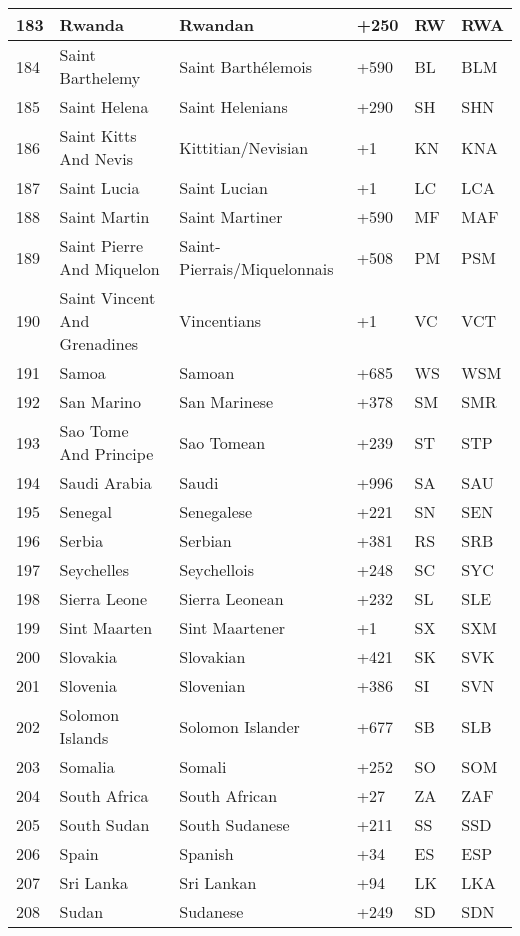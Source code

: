\begin{longtable}{|l|l|l|l|l|l|}
183 & Rwanda & Rwandan & +250 & RW & RWA \\ \hline 
184 & Saint Barthelemy & Saint Barthélemois & +590 & BL & BLM \\ \hline 
185 & Saint Helena & Saint Helenians & +290 & SH & SHN \\ \hline 
186 & Saint Kitts And Nevis & Kittitian/Nevisian & +1 & KN & KNA \\ \hline 
187 & Saint Lucia & Saint Lucian & +1 & LC & LCA \\ \hline 
188 & Saint Martin & Saint Martiner & +590 & MF & MAF \\ \hline 
189 & Saint Pierre And Miquelon & Saint-Pierrais/Miquelonnais & +508 & PM & PSM \\ \hline 
190 & Saint Vincent And Grenadines & Vincentians & +1 & VC & VCT \\ \hline 
191 & Samoa & Samoan & +685 & WS & WSM \\ \hline 
192 & San Marino & San Marinese & +378 & SM & SMR \\ \hline 
193 & Sao Tome And Principe & Sao Tomean & +239 & ST & STP \\ \hline 
194 & Saudi Arabia & Saudi & +996 & SA & SAU \\ \hline 
195 & Senegal & Senegalese & +221 & SN & SEN \\ \hline 
196 & Serbia & Serbian & +381 & RS & SRB \\ \hline 
197 & Seychelles & Seychellois & +248 & SC & SYC \\ \hline 
198 & Sierra Leone & Sierra Leonean & +232 & SL & SLE \\ \hline 
199 & Sint Maarten & Sint Maartener & +1 & SX & SXM \\ \hline 
200 & Slovakia & Slovakian & +421 & SK & SVK \\ \hline 
201 & Slovenia & Slovenian & +386 & SI & SVN \\ \hline 
202 & Solomon Islands & Solomon Islander & +677 & SB & SLB \\ \hline 
203 & Somalia & Somali & +252 & SO & SOM \\ \hline 
204 & South Africa & South African & +27 & ZA & ZAF \\ \hline 
205 & South Sudan & South Sudanese & +211 & SS & SSD \\ \hline 
206 & Spain & Spanish & +34 & ES & ESP \\ \hline 
207 & Sri Lanka & Sri Lankan & +94 & LK & LKA \\ \hline 
208 & Sudan & Sudanese & +249 & SD & SDN \\ \hline 

\end{longtable}
